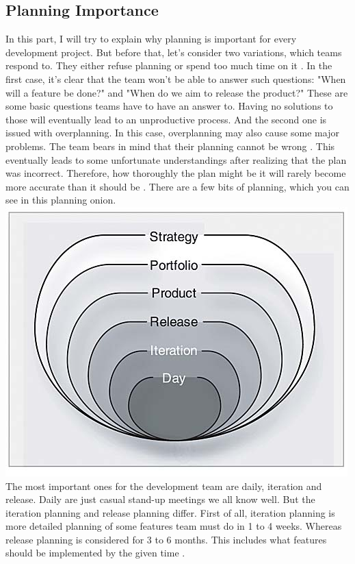\documentclass{scrartcl}
\begin{document}
\begin{multicols}{2}
\section{Planning Importance}
In this part, I will try to explain why planning is important for every development project.
But before that, let's consider two variations, which teams respond to.
They either refuse planning or spend too much time on it \cite{cohn2005agile}.
In the first case, it's clear that the team won't be able to answer such questions:
"When will a feature be done?" and "When do we aim to release the product?"
These are some basic questions teams have to have an answer to.
Having no solutions to those will eventually lead to an unproductive process.
And the second one is issued with overplanning.
In this case, overplanning may also cause some major problems.
The team bears in mind that their planning cannot be wrong \cite{cohn2005agile}.
This eventually leads to some unfortunate understandings after realizing that the plan was incorrect.
Therefore, how thoroughly the plan might be it will rarely become more accurate than it should be \cite{cohn2005agile}.
There are a few bits of planning, which you can see in this planning onion.
\includegraphics[scale=0.4]{onion}
The most important ones for the development team are daily, iteration and release.
Daily are just casual stand-up meetings we all know well.
But the iteration planning and release planning differ.
First of all, iteration planning is more detailed planning of some features team must do in 1 to 4 weeks.
Whereas release planning is considered for 3 to 6 months.
This includes what features should be implemented by the given time \cite{grenning2002planning}.

\end{multicols}
\end{document}
